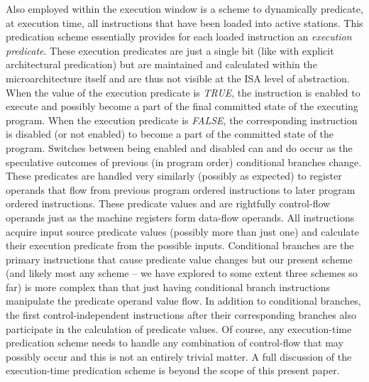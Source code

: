 
Also employed within the execution window is a scheme to
dynamically predicate, at execution time, 
all instructions that have been loaded
into active stations.  
This predication scheme essentially provides for each loaded instruction
an \textit{execution predicate}.  These execution predicates
are just a single bit (like with explicit architectural predication)
but are maintained and calculated within the microarchitecture
itself and are thus not visible at the ISA level of abstraction.
When the value of the execution predicate is \textit{TRUE}, the
instruction is enabled to execute and possibly become a part
of the final committed state of the executing program.
When the execution predicate is \textit{FALSE}, the
corresponding instruction is disabled (or not enabled) to
become a part of the committed state of the program.
Switches between being enabled and disabled can and do
occur as the speculative outcomes of previous (in program order)
conditional branches change.
These predicates are handled very similarly (possibly as expected)
to register operands that flow from previous program ordered
instructions to later program ordered instructions.
These predicate values and are rightfully control-flow operands
just as the machine registers form data-flow operands.
All instructions acquire input source predicate values (possibly
more than just one) and calculate their execution predicate
from the possible inputs.
Conditional branches are the primary instructions that
cause predicate value changes but our present scheme (and likely
most any scheme -- we have explored to some extent three schemes so far) 
is more complex than that just having conditional branch instructions
manipulate the predicate operand value flow.
In addition to conditional branches,
the first control-independent instructions after their
corresponding branches also participate in the calculation
of predicate values.  
Of course, any execution-time predication scheme needs to
handle any combination of control-flow that may possibly occur
and this is not an entirely trivial matter.
A full discussion of the execution-time predication scheme
is beyond the scope of this present paper.

